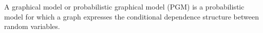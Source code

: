 \begin{slide}
A graphical model or probabilistic graphical model (PGM) is a probabilistic model for which a graph expresses the conditional dependence structure between random variables.
\end{slide}